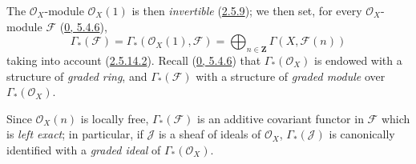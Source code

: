 \begin{env}[2.6.1]
\label{II.2.6.1}
The $\mathcal{O}_X$-module $\mathcal{O}_X(1)$ is then
\emph{invertible} (\hyperref[II.2.5.9]{2.5.9}); we then set, for every
$\mathcal{O}_X$-module $\mathcal{F}$
(\hyperref[0.5.4.6]{0, 5.4.6}),
\[
\label{II.2.6.1.1}
  \Gamma_*(\mathcal{F})
  =\Gamma_*(\mathcal{O}_X(1),\mathcal{F})
  =\bigoplus_{n\in\mathbf{Z}}\Gamma(X,\mathcal{F}(n))
\tag{2.6.1.1}
\]
taking into account (\hyperref[II.2.5.14.2]{2.5.14.2}). Recall
(\hyperref[0.5.4.6]{0, 5.4.6}) that $\Gamma_*(\mathcal{O}_X)$ is endowed
with a structure of \emph{graded ring}, and $\Gamma_*(\mathcal{F})$ with a
structure of
\emph{graded module} over $\Gamma_*(\mathcal{O}_X)$.

Since $\mathcal{O}_X(n)$ is locally free, $\Gamma_*(\mathcal{F})$
is an additive covariant functor in $\mathcal{F}$ which is
\emph{left exact}; in particular, if $\mathcal{J}$
is a sheaf of ideals of $\mathcal{O}_X$, $\Gamma_*(\mathcal{J})$
is canonically identified with a
\emph{graded ideal} of $\Gamma_*(\mathcal{O}_X)$.
\end{env}


